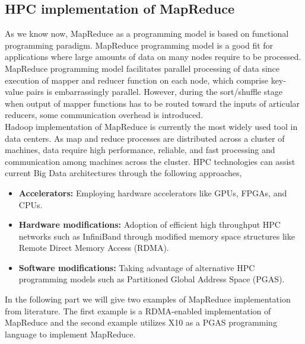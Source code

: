 \documentclass[runningheads,a4paper]{llncs}
\begin{document}
{\subsection{HPC implementation of MapReduce}
As we know now, MapReduce as a programming model is based on functional programming paradigm. MapReduce programming model is a good fit for applications where large amounts of data on many nodes require to be processed. MapReduce programming model facilitates parallel processing of data since execution of mapper and reducer function on each node, which comprise key-value pairs is embarrassingly parallel. However, during the sort/shuffle stage when output of mapper functions has to be routed toward the inputs of articular reducers, some communication overhead is introduced.\\

Hadoop implementation of MapReduce is currently the most widely used tool in data centers. As map and reduce processes are distributed across a cluster of machines, data require high performance, reliable, and fast processing and communication among machines across the cluster. HPC technologies can assist current Big Data architectures through the following approaches,
\begin{itemize}
	\item \textbf{Accelerators:} Employing hardware accelerators like GPUs, FPGAs, and CPUs.\\
	\item \textbf{Hardware modifications:} Adoption of efficient high throughput HPC networks such as InfiniBand through modified memory space structures like Remote Direct Memory Access (RDMA).\\
	\item \textbf{Software modifications:} Taking advantage of alternative HPC programming models such as Partitioned Global Address Space (PGAS).\\
\end{itemize}
In the following part we will give two examples of MapReduce implementation from literature. The first example is a RDMA-enabled implementation of MapReduce and the second example utilizes X10 as a PGAS programming language to implement MapReduce.\\


}
\end{document}
